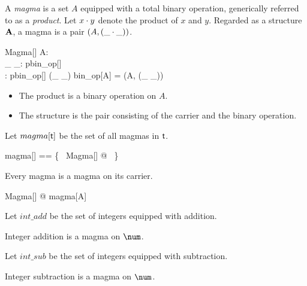 \documentclass{amsart}
\begin{document}
A \textit{magma} is a set $A$ equipped with a total binary operation, 
generically referred to as a \textit{product}.
Let $x \mathbin{\cdot} y$ denote the product of $x$ and $y$.
Regarded as a structure $\mathbf{A}$, a magma is a pair $(A, (\_ \mathbin{\cdot} \_))$.

\begin{schema}{Magma}[\genT]
	A: \power \genT \\
	\_ \opG \_: pbin\_op[\genT] \\
	\strucA: \power \genT \cross pbin\_op[\genT]
\where
	(\_ \opG \_) \in bin\_op[A]
\also
	\strucA = (A, (\_ \opG \_))
\end{schema}

\begin{itemize}
	\item The product is a binary operation on $A$.
	\item The structure is the pair consisting of the carrier and the binary operation.
\end{itemize}

Let $magma[\mathsf{t}]$ be the set of all magmas in $\mathsf{t}$.
\begin{zed}
	magma[\genT] == \{~ Magma[\genT] @ \strucA ~\}
\end{zed}

\begin{remark}
Every magma is a magma on its carrier.

\begin{zed}
	\forall Magma[\setT] @ \strucA \in magma[A]
\end{zed}

\end{remark}

\begin{example}

Let $int\_add$ be the set of integers equipped with addition.

Integer addition is a magma on $\num$.
\end{example}

\begin{example}

Let $int\_sub$ be the set of integers equipped with subtraction.


Integer subtraction is a magma on $\num$.


\end{example}
\end{document}
